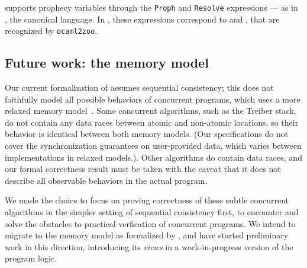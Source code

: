 \Zoo supports prophecy variables through the \texttt{Proph} and \texttt{Resolve} expressions --- as in \HeapLang, the canonical \Iris language.
In \OCaml, these expressions correspond to  and , that are recognized by \texttt{ocaml2zoo}.

\subsection{Future work: the \OCaml memory model}
\label{subsec:memory-model}

Our current formalization of \Zoo assumes sequential consistency; this
does not faithfully model all possible behaviors of concurrent \OCaml
programs, which uses a more relaxed memory
model~\citep*{ocaml-memory-model}. Some concurrent algorithms, such as
the Treiber stack, do not contain any data races between atomic and
non-atomic locations, so their behavior is identical between both
memory models. (Our specifications do not cover the synchronization
guarantees on user-provided data, which varies between implementations
in relaxed models.). Other algorithms do contain data races, and our
formal correctness result must be taken with the caveat that it does
not describe all observable behaviors in the actual \OCaml program.

We made the choice to focus on proving correctness of these subtle
concurrent algorithms in the simpler setting of sequential consistency
first, to encounter and solve the obstacles to practical verfication
of concurrent programs. We intend to migrate \Zoo to the \OCaml memory
model as formalized by \citet*{DBLP:journals/pacmpl/MevelJP20}, and
have started preliminary work in this direction, introducing its
\emph{views} in a work-in-progress version of the \ZooLang program
logic.

